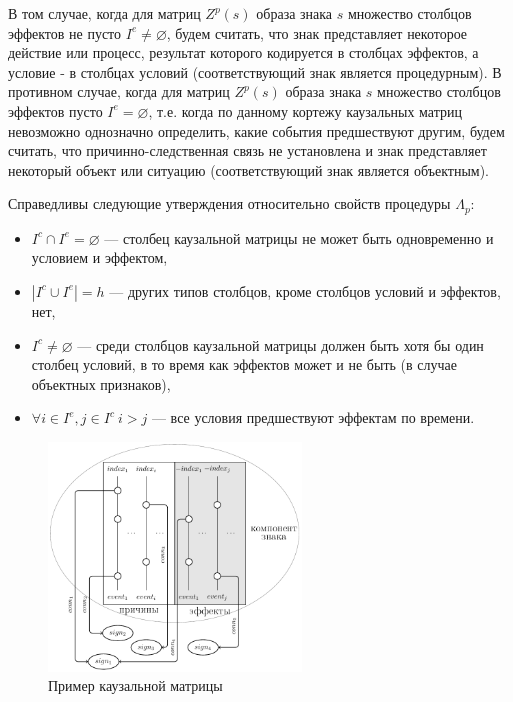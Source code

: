 \documentclass[12pt]{scrartcl}
\begin{document}
	В том случае, когда для матриц $Z^p(s)$ образа знака $s$ множество столбцов эффектов не пусто $I^e \not=\varnothing$, будем считать, что знак представляет некоторое действие или процесс, результат которого кодируется в столбцах эффектов, а условие - в столбцах условий (соответствующий знак является процедурным). В противном случае, когда для матриц $Z^p(s)$ образа знака $s$ множество столбцов эффектов пусто $I^e=\varnothing$, т.е. когда по данному кортежу каузальных матриц невозможно однозначно определить, какие события предшествуют другим, будем считать, что причинно-следственная связь не установлена и знак представляет некоторый объект или ситуацию (соответствующий знак является объектным). 
	
	Справедливы следующие утверждения относительно свойств процедуры $\Lambda_p$:
	\begin{itemize}
		\item $I^c\cap I^e=\varnothing$ --- столбец каузальной матрицы не может быть одновременно и условием и эффектом,
		\item $|I^c\cup I^e|=h$ --- других типов столбцов, кроме столбцов условий и эффектов, нет,
		\item $I^c\not = \varnothing$ --- среди столбцов каузальной матрицы должен быть хотя бы один столбец условий, в то время как эффектов может и не быть (в случае объектных признаков),
		\item $\forall i\in I^e, j\in I^c\ i>j$ --- все условия предшествуют эффектам по времени.
	\end{itemize}
	
	\begin{figure}[H]
		\centering
		\includegraphics[width=0.6\textwidth]{causnet/caus_matr_ru}
		\caption{Пример каузальной матрицы}	
		\label{fig:caus_matr}	
	\end{figure}
	
\end{document}
